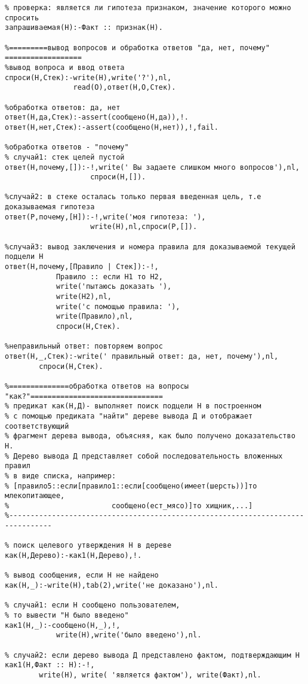 \documentclass[a4paper,14pt]{extarticle}
\begin{document}
\begin{lstlisting}
% проверка: является ли гипотеза признаком, значение которого можно спросить
запрашиваемая(H):-Факт :: признак(H).

%=========вывод вопросов и обработка ответов "да, нет, почему" ==================
%вывод вопроса и ввод ответа
спроси(H,Стек):-write(H),write('?'),nl,
				read(O),ответ(H,O,Стек).
				
%обработка ответов: да, нет
ответ(H,да,Стек):-assert(сообщено(H,да)),!.
ответ(H,нет,Стек):-assert(сообщено(H,нет)),!,fail. 

%обработка ответов - "почему"
% случай1: стек целей пустой
ответ(H,почему,[]):-!,write(' Вы задаете слишком много вопросов'),nl, 
					спроси(H,[]).

%случай2: в стеке осталась только первая введенная цель, т.е доказываемая гипотеза
ответ(P,почему,[H]):-!,write('моя гипотеза: '),
					write(H),nl,спроси(P,[]).
					
%случай3: вывод заключения и номера правила для доказываемой текущей подцели Н
ответ(H,почему,[Правило | Стек]):-!,
			Правило :: если H1 то H2,
			write('пытаюсь доказать '),
			write(H2),nl,
			write('с помощью правила: '),
			write(Правило),nl,
			спроси(H,Стек).
			
%неправильный ответ: повторяем вопрос
ответ(H,_,Стек):-write(' правильный ответ: да, нет, почему'),nl,
		спроси(H,Стек).
		
%==============обработка ответов на вопросы "как?"=============================== 
% предикат как(H,Д)- выполняет поиск подцели Н в построенном 
% с помощью предиката "найти" дереве вывода Д и отображает соответствующий
% фрагмент дерева вывода, объясняя, как было получено доказательство Н.
% Дерево вывода Д представляет собой последовательность вложенных правил
% в виде списка, например:
% [правило5::если[правило1::если[сообщено(имеет(шерсть))]то млекопитающее,
%                        сообщено(ест_мясо)]то хищник,...]
%--------------------------------------------------------------------------------

% поиск целевого утверждения Н в дереве 
как(H,Дерево):-как1(H,Дерево),!.

% вывод сообщения, если Н не найдено
как(H,_):-write(H),tab(2),write('не доказано'),nl.

% случай1: если Н сообщено пользователем,
% то вывести "Н было введено"
как1(H,_):-сообщено(H,_),!, 
			write(H),write('было введено'),nl.

% случай2: если дерево вывода Д представлено фактом, подтверждающим Н
как1(H,Факт :: H):-!, 
		write(H), write( 'является фактом'), write(Факт),nl.
		

\end{lstlisting}
\end{document}
